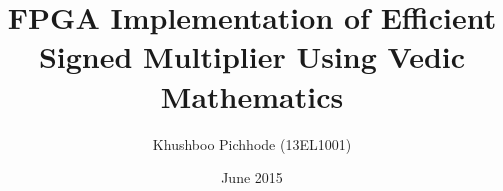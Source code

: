 \clearpage%

\title{FPGA Implementation of Efficient Signed Multiplier Using Vedic Mathematics}
\author{Khushboo Pichhode (13EL1001)}

\date{June 2015}



\maketitle

